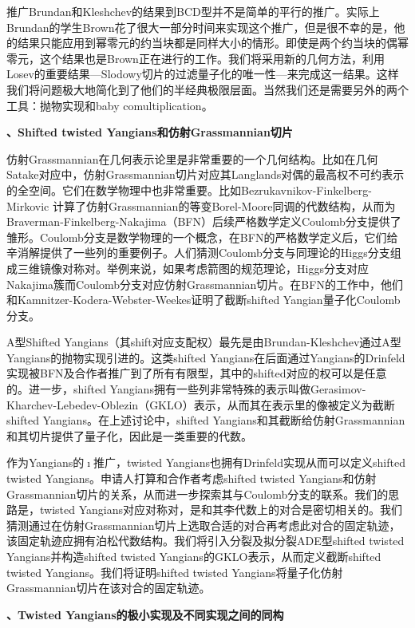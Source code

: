 \documentclass[12pt,UTF8,AutoFakeBold=4,a4paper]{ctexart}
\begin{document}
推广Brundan和Kleshchev的结果到BCD型并不是简单的平行的推广。实际上Brundan的学生Brown花了很大一部分时间来实现这个推广，但是很不幸的是，他的结果只能应用到幂零元的约当块都是同样大小的情形。即使是两个约当块的偶幂零元，这个结果也是Brown正在进行的工作。我们将采用新的几何方法，利用Losev的重要结果---Slodowy切片的过滤量子化的唯一性---来完成这一结果。这样我们将问题极大地简化到了他们的半经典极限层面。当然我们还是需要另外的两个工具：抛物实现和baby comultiplication。

\medskip

\textbf{、Shifted twisted Yangians和仿射Grassmannian切片}

仿射Grassmannian在几何表示论里是非常重要的一个几何结构。比如在几何Satake对应中，仿射Grassmannian切片对应其Langlands对偶的最高权不可约表示的全空间。它们在数学物理中也非常重要。比如Bezrukavnikov-Finkelberg-Mirkovic 计算了仿射Grassmannian的等变Borel-Moore同调的代数结构，从而为Braverman-Finkelberg-Nakajima（BFN）后续严格数学定义Coulomb分支提供了雏形。Coulomb分支是数学物理的一个概念，在BFN的严格数学定义后，它们给辛消解提供了一些列的重要例子。人们猜测Coulomb分支与同理论的Higgs分支组成三维镜像对称对。举例来说，如果考虑箭图的规范理论，Higgs分支对应Nakajima簇而Coulomb分支对应仿射Grassmannian切片。在BFN的工作中，他们和Kamnitzer-Kodera-Webster-Weekes证明了截断shifted Yangian量子化Coulomb分支。

A型Shifted Yangians（其shift对应支配权）最先是由Brundan-Kleshchev通过A型Yangians的抛物实现引进的。这类shifted Yangians在后面通过Yangians的Drinfeld实现被BFN及合作者推广到了所有有限型，其中的shifted对应的权可以是任意的。进一步，shifted Yangians拥有一些列非常特殊的表示叫做Gerasimov-Kharchev-Lebedev-Oblezin（GKLO）表示，从而其在表示里的像被定义为截断shifted Yangians。在上述讨论中，shifted Yangians和其截断给仿射Grassmannian和其切片提供了量子化，因此是一类重要的代数。

作为Yangians的$\imath$推广，twisted Yangians也拥有Drinfeld实现从而可以定义shifted twisted Yangians。申请人打算和合作者考虑shifted twisted Yangians和仿射Grassmannian切片的关系，从而进一步探索其与Coulomb分支的联系。我们的思路是，twisted Yangians对应对称对，是和其李代数上的对合是密切相关的。我们猜测通过在仿射Grassmannian切片上选取合适的对合再考虑此对合的固定轨迹，该固定轨迹应拥有泊松代数结构。我们将引入分裂及拟分裂ADE型shifted twisted Yangians并构造shifted twisted Yangians的GKLO表示，从而定义截断shifted twisted Yangians。我们将证明shifted twisted Yangians将量子化仿射Grassmannian切片在该对合的固定轨迹。

\medskip

\textbf{、Twisted Yangians的极小实现及不同实现之间的同构}
\end{document}
